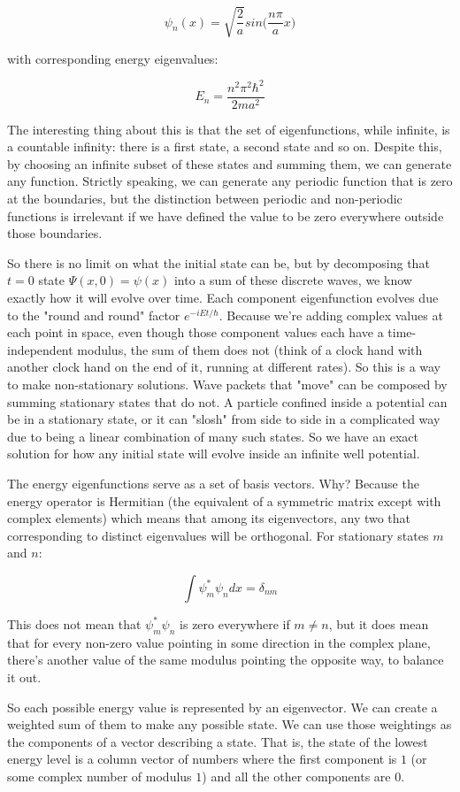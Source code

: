 $$
\psi_n(x) =
\sqrt{\frac{2}{a}} sin \lparen \frac{n\pi}{a} x\rparen
$$

with corresponding energy eigenvalues:

$$
E_n = \frac{n^2\pi^2\hbar^2}{2ma^2}
$$

The interesting thing about this is that the set of eigenfunctions, while infinite, is a countable infinity: there is a first state, a second state and so on. Despite this, by choosing an infinite subset of these states and summing them, we can generate any function. Strictly speaking, we can generate any periodic function that is zero at the boundaries, but the distinction between periodic and non-periodic functions is irrelevant if we have defined the value to be zero everywhere outside those boundaries.

So there is no limit on what the initial state can be, but by decomposing that $t = 0$ state $\Psi(x, 0) = \psi(x)$ into a sum of these discrete waves, we know exactly how it will evolve over time. Each component eigenfunction evolves due to the "round and round" factor $e^{-iEt/\hbar}$. Because we're adding complex values at each point in space, even though those component values each have a time-independent modulus, the sum of them does not (think of a clock hand with another clock hand on the end of it, running at different rates). So this is a way to make non-stationary solutions. Wave packets that "move" can be composed by summing stationary states that do not. A particle confined inside a potential can be in a stationary state, or it can "slosh" from side to side in a complicated way due to being a linear combination of many such states. So we have an exact solution for how any initial state will evolve inside an infinite well potential.

The energy eigenfunctions serve as a set of basis vectors. Why? Because the energy operator is Hermitian (the equivalent of a symmetric matrix except with complex elements) which means that among its eigenvectors, any two that corresponding to distinct eigenvalues will be orthogonal. For stationary states $m$ and $n$:

$$
\int
\psi_m^* \psi_n dx = \delta_{nm}
$$

This does not mean that $\psi_m^* \psi_n$ is zero everywhere if $m \ne n$, but it does mean that for every non-zero value pointing in some direction in the complex plane, there's another value of the same modulus pointing the opposite way, to balance it out.

So each possible energy value is represented by an eigenvector. We can create a weighted sum of them to make any possible state. We can use those weightings as the components of a vector describing a state. That is, the state of the lowest energy level is a column vector of numbers where the first component is $1$ (or some complex number of modulus $1$) and all the other components are $0$.

